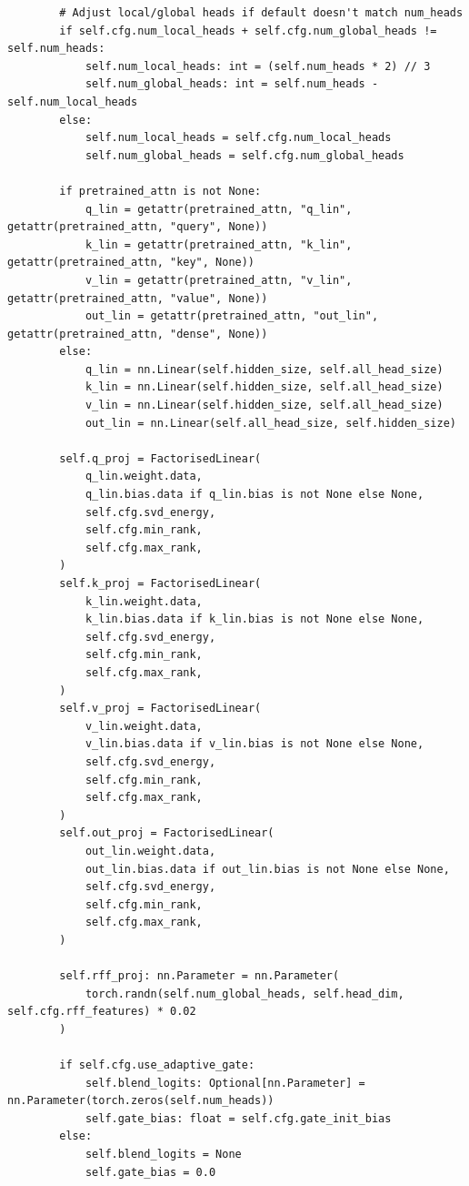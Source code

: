 \begin{lstlisting}
        # Adjust local/global heads if default doesn't match num_heads
        if self.cfg.num_local_heads + self.cfg.num_global_heads != self.num_heads:
            self.num_local_heads: int = (self.num_heads * 2) // 3
            self.num_global_heads: int = self.num_heads - self.num_local_heads
        else:
            self.num_local_heads = self.cfg.num_local_heads
            self.num_global_heads = self.cfg.num_global_heads

        if pretrained_attn is not None:
            q_lin = getattr(pretrained_attn, "q_lin", getattr(pretrained_attn, "query", None))
            k_lin = getattr(pretrained_attn, "k_lin", getattr(pretrained_attn, "key", None))
            v_lin = getattr(pretrained_attn, "v_lin", getattr(pretrained_attn, "value", None))
            out_lin = getattr(pretrained_attn, "out_lin", getattr(pretrained_attn, "dense", None))
        else:
            q_lin = nn.Linear(self.hidden_size, self.all_head_size)
            k_lin = nn.Linear(self.hidden_size, self.all_head_size)
            v_lin = nn.Linear(self.hidden_size, self.all_head_size)
            out_lin = nn.Linear(self.all_head_size, self.hidden_size)

        self.q_proj = FactorisedLinear(
            q_lin.weight.data,
            q_lin.bias.data if q_lin.bias is not None else None,
            self.cfg.svd_energy,
            self.cfg.min_rank,
            self.cfg.max_rank,
        )
        self.k_proj = FactorisedLinear(
            k_lin.weight.data,
            k_lin.bias.data if k_lin.bias is not None else None,
            self.cfg.svd_energy,
            self.cfg.min_rank,
            self.cfg.max_rank,
        )
        self.v_proj = FactorisedLinear(
            v_lin.weight.data,
            v_lin.bias.data if v_lin.bias is not None else None,
            self.cfg.svd_energy,
            self.cfg.min_rank,
            self.cfg.max_rank,
        )
        self.out_proj = FactorisedLinear(
            out_lin.weight.data,
            out_lin.bias.data if out_lin.bias is not None else None,
            self.cfg.svd_energy,
            self.cfg.min_rank,
            self.cfg.max_rank,
        )

        self.rff_proj: nn.Parameter = nn.Parameter(
            torch.randn(self.num_global_heads, self.head_dim, self.cfg.rff_features) * 0.02
        )

        if self.cfg.use_adaptive_gate:
            self.blend_logits: Optional[nn.Parameter] = nn.Parameter(torch.zeros(self.num_heads))
            self.gate_bias: float = self.cfg.gate_init_bias
        else:
            self.blend_logits = None
            self.gate_bias = 0.0


\end{lstlisting}
